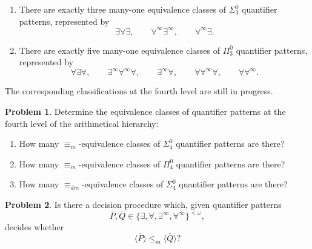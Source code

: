 \documentclass[11pt]{amsart}
\theoremstyle{definition}
\newtheorem{problem}{Problem}[section]
\begin{document}
{\begin{enumerate}
    \item[(3)] There are exactly three many-one equivalence classes of
    $\Sigma^0_3$ quantifier patterns, represented by
    \[
        \exists\forall\exists,\qquad
        \forall^\infty\exists^\infty,\qquad
        \forall^\infty\exists.
    \]

    \item[(4)] There are exactly five many-one equivalence classes of
    $\Pi^0_3$ quantifier patterns, represented by
    \[
        \forall\exists\forall,\qquad
        \exists^\infty\forall^\infty\forall,\qquad
        \exists^\infty\forall,\qquad
        \forall\forall^\infty\forall,\qquad
        \forall\forall^\infty.
    \]
\end{enumerate}

The corresponding classifications at the fourth level are still in
progress.

\begin{problem}
    Determine the equivalence classes of quantifier patterns at the
    fourth level of the arithmetical hierarchy:
    \begin{enumerate}
        \item[(1)] How many $\equiv_m$-equivalence classes of
        $\Sigma^0_4$ quantifier patterns are there?

        \item[(2)] How many $\equiv_m$-equivalence classes of
        $\Pi^0_4$ quantifier patterns are there?

        \item[(3)] How many $\equiv_{dm}$-equivalence classes of
        $\Sigma^0_4$ quantifier patterns are there?
    \end{enumerate}
\end{problem}



\begin{problem}
    Is there a decision procedure which, given quantifier patterns
    \[
        \overline{P},\overline{Q}
        \in
        \{\exists,\forall,\exists^\infty,\forall^\infty\}^{<\omega},
    \]
    decides whether
    \[
        \langle\overline{P}\rangle
        \leq_m
        \langle\overline{Q}\rangle?
    \]
\end{problem}



}
\end{document}
